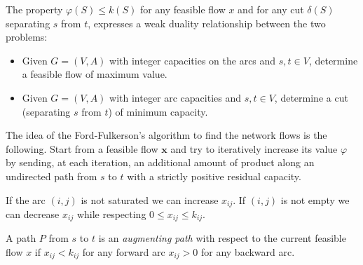 \documentclass[12pt, a4paper]{report}
\begin{document}
    The property $\varphi(S) \leq k(S)$ for any feasible flow $x$ and for any cut $\delta(S)$ separating $s$ from $t$, expresses a weak duality relationship between the two problems:
    \begin{itemize}
        \item Given $G = (V,A)$ with integer capacities on the arcs and $s,t \in V$, determine a feasible flow of maximum value. 
        \item Given $G = (V,A)$ with integer arc capacities and $s,t \in V$, determine a cut (separating $s$ from $t$) of minimum capacity. 
    \end{itemize} 

    The idea of the Ford-Fulkerson's algorithm to find the network flows is the following. Start from a feasible flow $\boldsymbol{x}$ and try to iteratively increase its value $\varphi$ by 
    sending, at each iteration, an additional amount of product along an undirected path from $s$ to $t$ with a strictly positive residual capacity. 

    If the arc $(i,j)$ is not saturated we can increase $x_{ij}$. If $(i,j)$ is not empty we can decrease $x_{ij}$ while respecting $0 \leq x_{ij} \leq k_{ij}$. 
    \begin{definition}
        A path $P$ from $s$ to $t$ is an \emph{augmenting path} with respect to the current feasible flow $x$ if $x_{ij} <  k_{ij}$ for any
        forward arc $x_{ij}>0$ for any backward arc. 
    \end{definition}
\end{document}
